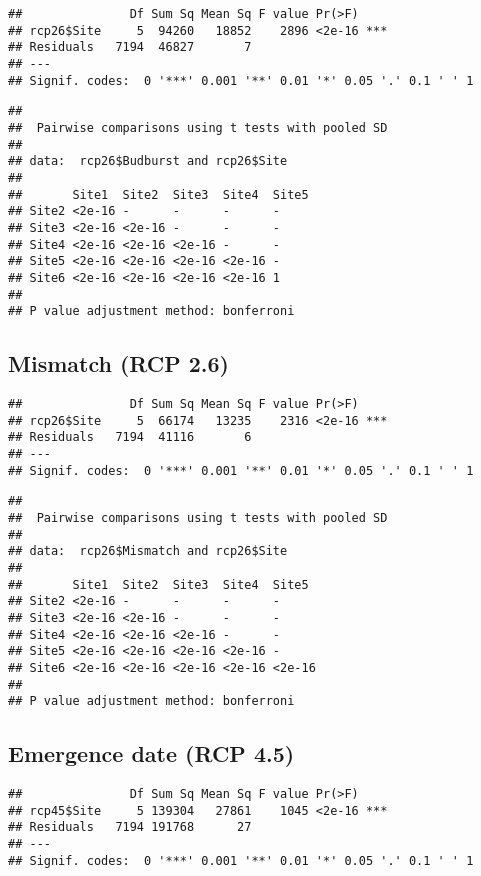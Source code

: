\documentclass[
]{article}
\begin{document}
\begin{verbatim}
##               Df Sum Sq Mean Sq F value Pr(>F)    
## rcp26$Site     5  94260   18852    2896 <2e-16 ***
## Residuals   7194  46827       7                   
## ---
## Signif. codes:  0 '***' 0.001 '**' 0.01 '*' 0.05 '.' 0.1 ' ' 1
\end{verbatim}

\begin{verbatim}
## 
##  Pairwise comparisons using t tests with pooled SD 
## 
## data:  rcp26$Budburst and rcp26$Site 
## 
##       Site1  Site2  Site3  Site4  Site5
## Site2 <2e-16 -      -      -      -    
## Site3 <2e-16 <2e-16 -      -      -    
## Site4 <2e-16 <2e-16 <2e-16 -      -    
## Site5 <2e-16 <2e-16 <2e-16 <2e-16 -    
## Site6 <2e-16 <2e-16 <2e-16 <2e-16 1    
## 
## P value adjustment method: bonferroni
\end{verbatim}

\hypertarget{mismatch-rcp-2.6}{%
\subsection{Mismatch (RCP 2.6)}\label{mismatch-rcp-2.6}}

\begin{verbatim}
##               Df Sum Sq Mean Sq F value Pr(>F)    
## rcp26$Site     5  66174   13235    2316 <2e-16 ***
## Residuals   7194  41116       6                   
## ---
## Signif. codes:  0 '***' 0.001 '**' 0.01 '*' 0.05 '.' 0.1 ' ' 1
\end{verbatim}

\begin{verbatim}
## 
##  Pairwise comparisons using t tests with pooled SD 
## 
## data:  rcp26$Mismatch and rcp26$Site 
## 
##       Site1  Site2  Site3  Site4  Site5 
## Site2 <2e-16 -      -      -      -     
## Site3 <2e-16 <2e-16 -      -      -     
## Site4 <2e-16 <2e-16 <2e-16 -      -     
## Site5 <2e-16 <2e-16 <2e-16 <2e-16 -     
## Site6 <2e-16 <2e-16 <2e-16 <2e-16 <2e-16
## 
## P value adjustment method: bonferroni
\end{verbatim}

\hypertarget{emergence-date-rcp-4.5}{%
\subsection{Emergence date (RCP 4.5)}\label{emergence-date-rcp-4.5}}

\begin{verbatim}
##               Df Sum Sq Mean Sq F value Pr(>F)    
## rcp45$Site     5 139304   27861    1045 <2e-16 ***
## Residuals   7194 191768      27                   
## ---
## Signif. codes:  0 '***' 0.001 '**' 0.01 '*' 0.05 '.' 0.1 ' ' 1
\end{verbatim}
\end{document}

